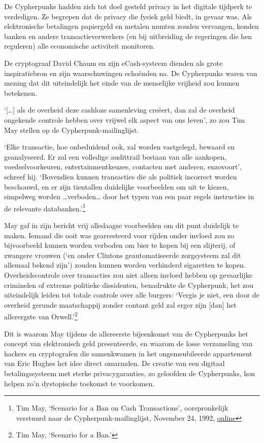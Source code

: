 \documentclass[smalldemyvopaper,11pt,twoside,onecolumn,openright,extrafontsizes,hidelinks]{memoir}
\begin{document}
De Cypherpunks hadden zich tot doel gesteld privacy in het digitale
tijdperk te verdedigen. Ze begrepen dat de privacy die fysiek geld
biedt, in gevaar was. Als elektronische betalingen papiergeld en metalen
munten zouden vervangen, konden banken en andere transactieverwerkers
(en bij uitbreiding de regeringen die hen reguleren) alle economische
activiteit monitoren.

De cryptograaf David Chaum en zijn eCash-systeem dienden als grote
inspiratiebron en zijn waarschuwingen echoënden na. De Cypherpunks waren
van mening dat dit uiteindelijk het einde van de menselijke vrijheid zou
kunnen betekenen.

`{[}\ldots{]} als de overheid deze cashloze samenleving creëert, dan zal
de overheid ongekende controle hebben over vrijwel elk aspect van ons
leven', zo zou Tim May stellen op de Cypherpunk-mailinglijst.

`Elke transactie, hoe onbeduidend ook, zal worden vastgelegd, bewaard en
geanalyseerd. Er zal een volledige audittrail bestaan van alle aankopen,
voedselvoorkeuren, entertainmentkeuzes, contacten met anderen,
enzovoort', schreef hij. `Bovendien kunnen transacties die als politiek
incorrect worden beschouwd, en er zijn tientallen duidelijke voorbeelden
om uit te kiezen, simpelweg worden \ldots verboden\ldots{} door het
typen van een paar regels instructies in de relevante
databanken.'\footnote{Tim May, `Scenario for a Ban on Cash
  Transactions', oorspronkelijk verstuurd naar de
  Cypherpunk-mailinglijst, November 24, 1992,
  \href{https://cypherpunks.venona.com/date/1992/11/msg00211.html}{online}}

May gaf in zijn bericht vrij alledaagse voorbeelden om dit punt
duidelijk te maken. Iemand die ooit was gearresteerd voor rijden onder
invloed zou zo bijvoorbeeld kunnen worden verboden om bier te kopen bij
een slijterij, of zwangere vrouwen (`en onder Clintons geautomatiseerde
zorgsysteem zal dit allemaal bekend zijn') zouden kunnen worden
verhinderd sigaretten te kopen. Overheidscontrole over transacties zou
niet alleen invloed hebben op gevaarlijke criminelen of extreme
politieke dissidenten, benadrukte de Cypherpunk, het zou uiteindelijk
leiden tot totale controle over alle burgers: `Vergis je niet, een door
de overheid gerunde maatschappij zonder contant geld zal erger zijn
{[}dan{]} het allerergste van Orwell.'\footnote{Tim May, `Scenario for a
  Ban.'}

Dit is waarom May tijdens de allereerste bijeenkomst van de Cypherpunks
het concept van elektronisch geld presenteerde, en waarom de losse
verzameling van hackers en cryptografen die samenkwamen in het
ongemeubileerde appartement van Eric Hughes het idee direct omarmden. De
creatie van een digitaal betalingssysteem met sterke privacygaranties,
zo geloofden de Cypherpunks, kon helpen zo'n dystopische toekomst te
voorkomen.
\end{document}
